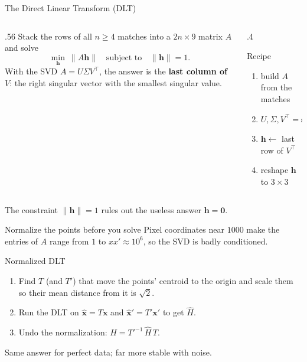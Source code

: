 \documentclass[aspectratio=169,11pt]{beamer}
\begin{document}
\begin{frame}{The Direct Linear Transform (DLT)}
  \begin{columns}[T]
    \begin{column}{.56\textwidth}
      Stack the rows of all $n\ge 4$ matches into a $2n\times 9$ matrix $A$ and solve
      \[
        \min_{\mathbf{h}}\ \lVert A\mathbf{h}\rVert \quad\text{subject to}\quad \lVert\mathbf{h}\rVert=1 .
      \]
      With the SVD $A=U\Sigma V^\top$, the answer is the \textbf{last column of $V$}: the right singular vector with the smallest singular value.
    \end{column}
    \begin{column}{.4\textwidth}
      \begin{block}{Recipe}
        \small
        \begin{enumerate}\setlength{\itemsep}{.25em}
          \item build $A$ from the matches
          \item $U,\Sigma,V^\top=\mathrm{svd}(A)$
          \item $\mathbf{h}\leftarrow$ last row of $V^\top$
          \item reshape $\mathbf{h}$ to $3\times3$
        \end{enumerate}
      \end{block}
    \end{column}
  \end{columns}
  \vspace{.8em}
  {\small\color{muted} The constraint $\lVert\mathbf{h}\rVert=1$ rules out the useless answer $\mathbf{h}=\mathbf{0}$.}
\end{frame}

\begin{frame}{Normalize the points before you solve}
  Pixel coordinates near $1000$ make the entries of $A$ range from $1$ to $xx'\approx 10^6$, so the SVD is badly conditioned.
  \vspace{.5em}
  \begin{block}{Normalized DLT}
    \begin{enumerate}\setlength{\itemsep}{.3em}
      \item Find $T$ (and $T'$) that move the points' centroid to the origin and scale them so their mean distance from it is $\sqrt{2}$.
      \item Run the DLT on $\hat{\mathbf{x}}=T\mathbf{x}$ and $\hat{\mathbf{x}}'=T'\mathbf{x}'$ to get $\hat H$.
      \item Undo the normalization: $H=T'^{-1}\,\hat H\,T$.
    \end{enumerate}
  \end{block}
  \vspace{.4em}
  {\small\color{muted} Same answer for perfect data; far more stable with noise.}
\end{frame}
\end{document}
